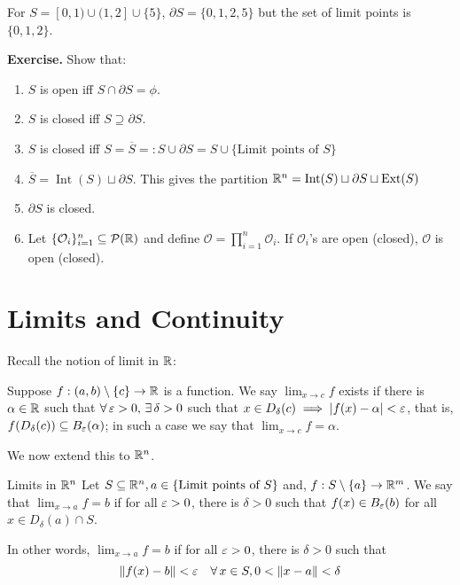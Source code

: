 \documentclass[../Analysis-3.tex]{subfiles}
\begin{document}
\begin{Eg}{}{}
  For $ S = [0,1) \cup (1,2] \cup \{5\} $, $ \partial S = \{0,1,2,5\} $ but the set of limit points is $ \{0,1,2\} $.
\end{Eg}
\textbf{Exercise.} Show that:
\begin{enumerate}[label = (\arabic*)]
  \item $ S $ is open iff $ S \cap \partial S = \phi $.
  \item $ S $ is closed iff $ S \supseteq \partial S $.
  \item $ S $ is closed iff $ S = \overline{S} =: S \cup \partial S = S \cup \{\text{Limit points of } S\} $
  \item $ \overline{S} = \operatorname{Int}(S) \sqcup \partial S $. This gives the partition $ \mathbb{R}^n = \operatorname{Int}(S) \sqcup \partial S \sqcup \operatorname{Ext}(S) $
  \item $ \partial S $ is closed.
  \item Let $ \{\mathcal O_i\}_{i=1}^n \subseteq \mathcal P(\mathbb{R}) $ and define $ \mathcal O = \prod_{i=1}^{n} \mathcal O_i $. If $ \mathcal{O}_i $'s are open (closed), $ \mathcal O $ is open (closed).
\end{enumerate}
\pagebreak

\section{Limits and Continuity}
Recall the notion of limit in $ \mathbb{R} $:
\ssk

Suppose $ f: (a,b)\setminus \{c\} \to \mathbb{R} $ is a function. We say $ \displaystyle\lim_{x \to c}f $ exists if there is $ \alpha \in \mathbb{R} $ such that $ \forall \, \varepsilon > 0, \, \exists \, \delta > 0 $ such that $ x \in D_{\delta}(c) \implies \abs{f(x) - \alpha} < \varepsilon $, that is, $ f(D_\delta(c)) \subseteq B_\varepsilon(\alpha) $; in such a case we say that $ \displaystyle \lim_{x \to c}f = \alpha $.

We now extend this to $ \mathbb{R}^n $.
\msk

\begin{Def}{Limits in $ \mathbb{R}^n $}{}
  Let $ S \subseteq \mathbb{R}^n, a \in \{\text{Limit points of } S\} $ and, $ f: S \setminus \{a\} \to \mathbb{R}^m $. We say that $ \displaystyle \lim_{x \to a}f = b $ if for all $ \varepsilon > 0 $, there is $ \delta > 0 $ such that $ f(x) \in B_\varepsilon(b) $ for all $ x \in D_\delta(a) \cap S $.

  In other words, $ \displaystyle \lim_{x \to a}f = b $ if for all $ \varepsilon > 0 $, there is $ \delta > 0 $ such that
  \[ \norm{f(x) - b} < \varepsilon \quad \forall \, x \in S, 0 < \norm{x - a} < \delta \]
\end{Def}
\msk
\end{document}

